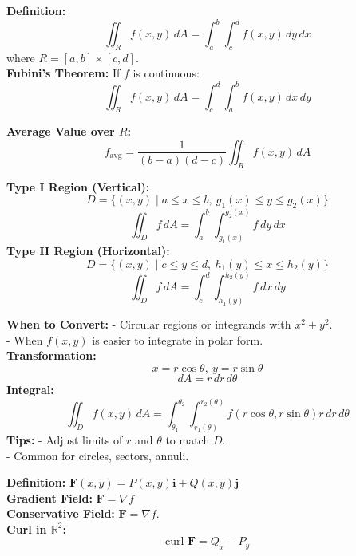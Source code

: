 \documentclass[9pt]{article}
\begin{document}
\begin{multicols}{2}
\begin{tcolorbox}[title=\textbf{Double Integrals over Rectangles}, colframe=lightyellow]
\textbf{Definition:}
\[ \iint_R f(x, y) \, dA = \int_a^b \int_c^d f(x, y) \, dy \, dx \]
where \( R = [a, b] \times [c, d] \). \\
\textbf{Fubini's Theorem:} If \( f \) is continuous:
\[ \iint_R f(x, y) \, dA = \int_c^d \int_a^b f(x, y) \, dx \, dy \]
\end{tcolorbox}

\begin{tcolorbox}[title=\textbf{Average Value of a Function}, colframe=lightpink]
\textbf{Average Value over \( R \):}
\[ f_{\text{avg}} = \frac{1}{(b - a)(d - c)} \iint_R f(x, y) \, dA \]
\end{tcolorbox}

\begin{tcolorbox}[title=\textbf{Double Integrals over General Regions}, colframe=lightblue]
\textbf{Type I Region (Vertical):}
\[ D = \{ (x, y) \mid a \leq x \leq b,\ g_1(x) \leq y \leq g_2(x) \} \]
\[ \iint_D f \, dA = \int_a^b \int_{g_1(x)}^{g_2(x)} f \, dy \, dx \]
\textbf{Type II Region (Horizontal):}
\[ D = \{ (x, y) \mid c \leq y \leq d,\ h_1(y) \leq x \leq h_2(y) \} \]
\[ \iint_D f \, dA = \int_c^d \int_{h_1(y)}^{h_2(y)} f \, dx \, dy \]
\end{tcolorbox}

\begin{tcolorbox}[title=\textbf{Double Integrals in Polar Coordinates}, colframe=lightgreen]
\textbf{When to Convert:}
- Circular regions or integrands with \( x^2 + y^2 \). \\
- When \( f(x, y) \) is easier to integrate in polar form. \\
\textbf{Transformation:}
\[ x = r \cos \theta,\ y = r \sin \theta \]
\[ dA = r \, dr \, d\theta \]
\textbf{Integral:}
\[ \iint_D f(x, y) \, dA = \int_{\theta_1}^{\theta_2} \int_{r_1(\theta)}^{r_2(\theta)} f(r \cos \theta, r \sin \theta) r \, dr \, d\theta \]
\textbf{Tips:}
- Adjust limits of \( r \) and \( \theta \) to match \( D \). \\
- Common for circles, sectors, annuli.
\end{tcolorbox}

\begin{tcolorbox}[title=\textbf{Vector Fields}, colframe=lightpink]
\textbf{Definition:}
\( \mathbf{F}(x, y) = P(x, y) \mathbf{i} + Q(x, y) \mathbf{j} \) \\
\textbf{Gradient Field:} \( \mathbf{F} = \nabla f \) \\
\textbf{Conservative Field:} \( \mathbf{F} = \nabla f \). \\
\textbf{Curl in \( \mathbb{R}^2 \):}
\[ \text{curl } \mathbf{F} = Q_x - P_y \]
\end{tcolorbox}


\end{multicols}
\end{document}
